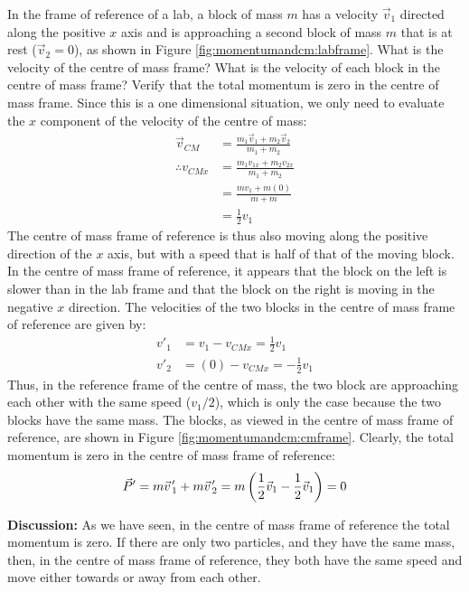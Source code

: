 \begin{example}{ In the frame of reference of a lab, a block of mass $m$ has a velocity $\vec v_1$ directed along the positive $x$ axis and is approaching a second block of mass $m$ that is at rest ($\vec v_2=0$), as shown in Figure \ref{fig:momentumandcm:labframe}. What is the velocity of the centre of mass frame? What is the velocity of each block in the centre of mass frame? Verify that the total momentum is zero in the centre of mass frame.}
Since this is a one dimensional situation, we only need to evaluate the $x$ component of the velocity of the centre of mass:
\begin{align*}
\vec v_{CM} &= \frac{m_1\vec v_1 + m_2\vec v_2 }{m_1+m_2}\\
\therefore v_{CMx} &= \frac{m_1 v_{1x} + m_2 v_{2x}}{m_1+m_2}\\
&=\frac{mv_1 + m(0) }{m+m}\\
&=\frac{1}{2}v_1
\end{align*}
The centre of mass frame of reference is thus also moving along the positive direction of the $x$ axis, but with a speed that is half of that of the moving block. In the centre of mass frame of reference, it appears that the block on the left is slower than in the lab frame and that the block on the right is moving in the negative $x$ direction. The velocities of the two blocks in the centre of mass frame of reference are given by:
\begin{align*}
v'_1&=v_1-v_{CMx}=\frac{1}{2}v_1\\
v'_2&=(0)-v_{CMx}=-\frac{1}{2}v_1
\end{align*}
Thus, in the reference frame of the centre of mass, the two block are approaching each other with the same speed ($v_1/2$), which is only the case because the two blocks have the same mass. The blocks, as viewed in the centre of mass frame of reference, are shown in Figure \ref{fig:momentumandcm:cmframe}.
Clearly, the total momentum is zero in the centre of mass frame of reference:
\begin{align*}
\vec P' = m\pvec v'_1+ m\pvec v'_2 = m \left(\frac{1}{2}\vec v_1 - \frac{1}{2}\vec v_1\right) = 0
\end{align*}

\textbf{Discussion:} As we have seen, in the centre of mass frame of reference the total momentum is zero. If there are only two particles, and they have the same mass, then, in the centre of mass frame of reference, they both have the same speed and move either towards or away from each other. 
\end{example}




